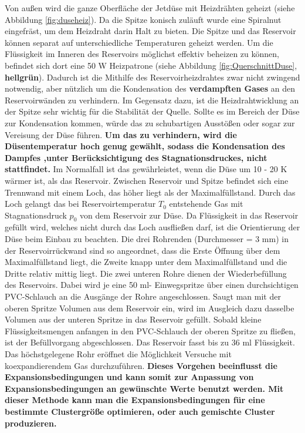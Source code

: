   Von außen wird die ganze Oberfläche der Jetdüse mit Heizdrähten geheizt (siehe Abbildung \ref{fig:duseheiz}). Da die Spitze konisch zuläuft wurde eine Spiralnut eingefräst, um dem Heizdraht darin Halt zu bieten. Die Spitze und das Reservoir können separat auf unterschiedliche Temperaturen geheizt werden. Um die Flüssigkeit im Inneren des Reservoirs möglichst effektiv beheizen zu können, befindet sich dort eine 50 W Heizpatrone (siehe Abbildung \ref{fig:QuerschnittDuse}, \textbf{hellgrün}). Dadurch ist die Mithilfe des Reservoirheizdrahtes zwar nicht zwingend notwendig, aber nützlich um die Kondensation des \textbf{verdampften Gases}
  an den Reservoirwänden zu verhindern. Im Gegensatz dazu, ist die Heizdrahtwicklung an der Spitze sehr wichtig für die Stabilität der Quelle. Sollte es im Bereich der Düse zur Kondensation kommen, würde das zu schubartigen Ausstößen oder sogar zur Vereisung der Düse führen. \textbf{Um das zu verhindern, wird die Düsentemperatur hoch genug gewählt, sodass die Kondensation des Dampfes ,unter Berücksichtigung des Stagnationsdruckes, nicht stattfindet.} Im Normalfall ist das gewährleistet, wenn die Düse um 10 - 20 K wärmer ist, als das Reservoir.
  Zwischen Reservoir und Spitze befindet sich eine Trennwand mit einem Loch, das höher liegt als der Maximalfüllstand. Durch das Loch gelangt das bei Reservoirtemperatur $T_0$ entstehende Gas mit Stagnationsdruck $p_0$ von dem Reservoir zur Düse. 
  Da Flüssigkeit in das Reservoir gefüllt wird, welches nicht durch das Loch ausfließen darf, ist die Orientierung der Düse beim Einbau zu beachten. Die drei Rohrenden (Durchmesser = 3 mm) in der Reservoirrückwand sind so angeordnet, dass die Erste Öffnung über dem Maximalfüllstand liegt, die Zweite knapp unter dem Maximalfüllstand und die Dritte relativ mittig liegt. Die zwei unteren Rohre dienen der Wiederbefüllung des Reservoirs. Dabei wird je eine 50 ml- Einwegspritze über einen durchsichtigen PVC-Schlauch an die Ausgänge der Rohre angeschlossen. Saugt man mit der oberen Spritze Volumen aus dem Reservoir ein, wird im Ausgleich dazu dasselbe Volumen aus der unteren Spritze in das Reservoir gefüllt. Sobald kleine Flüssigkeitsmengen anfangen in den PVC-Schlauch der oberen Spritze zu fließen, ist der Befüllvorgang abgeschlossen. Das Reservoir fasst bis zu 36 ml Flüssigkeit. Das höchstgelegene Rohr eröffnet die Möglichkeit Versuche mit koexpandierendem Gas durchzuführen. \textbf{Dieses Vorgehen beeinflusst die Expansionsbedingungen und kann somit zur Anpassung von Expansionsbedingungen an gewünschte Werte benutzt werden.
   Mit dieser Methode kann man die Expansionsbedingungen für eine bestimmte Clustergröße optimieren, oder auch gemischte Cluster produzieren. }
   
